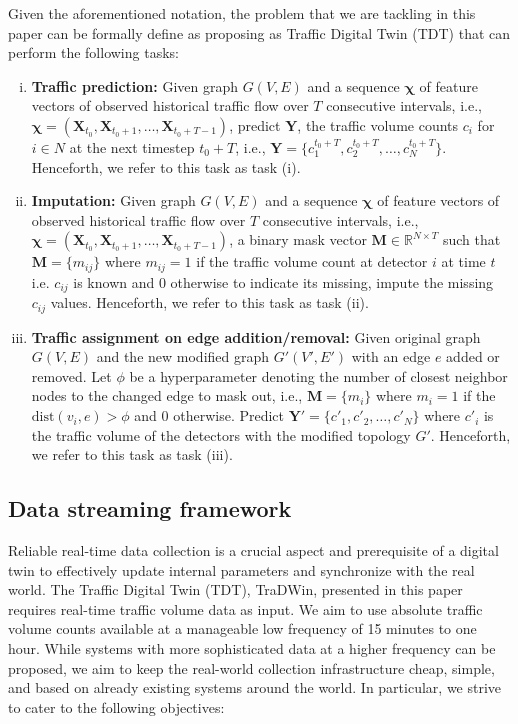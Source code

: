 \documentclass[conference]{IEEEtran}
\newcommand{\name}{TraDWin}
\begin{document}
Given the aforementioned notation, the problem that we are tackling in this paper can be formally define as proposing as Traffic Digital Twin (TDT) that can perform the following tasks:
\begin{enumerate}[(i)]
    \item \textbf{Traffic prediction:} Given graph $G(V, E)$ and a sequence $\bm{\chi}$ of feature vectors of observed historical traffic flow over $T$ consecutive intervals, i.e., $\bm{\chi} = (\mathbf{X}_{t_0}, \mathbf{X}_{t_0+1}, \ldots, \mathbf{X}_{t_0+T-1})$, predict $\mathbf{Y}$, the traffic volume counts $c_i$ for $i \in N$ at the next timestep $t_0+T$, i.e., $\mathbf{Y} = \{c_1^{t_0+T}, c_2^{t_0+T}, \ldots, c_N^{t_0+T}\}$. Henceforth, we refer to this task as task (i).
    \item \textbf{Imputation:} Given graph $G(V,E)$ and a sequence $\bm{\chi}$ of feature vectors of observed historical traffic flow over $T$ consecutive intervals, i.e., $\bm{\chi} = (\mathbf{X}_{t_0}, \mathbf{X}_{t_0+1}, \ldots, \mathbf{X}_{t_0+T-1})$, a binary mask vector $\mathbf{M} \in \mathbb{R}^{N \times T}$ such that $\mathbf{M} = \{m_{ij}\}$ where $m_{ij} = 1$ if the traffic volume count at detector $i$ at time $t$ i.e. $c_{ij}$ is known and 0 otherwise to indicate its missing, impute the missing $c_{ij}$ values. Henceforth, we refer to this task as task (ii).
    \item \textbf{Traffic assignment on edge addition/removal:} Given original graph $G(V,E)$ and the new modified graph $G'(V', E')$ with an edge $e$ added or removed. Let $\phi$ be a hyperparameter denoting the number of closest neighbor nodes to the changed edge to mask out, i.e., $\mathbf{M} = \{m_i\}$ where $m_i = 1$ if the $\text{dist}(v_i,e)> \phi$ and 0 otherwise. Predict $\mathbf{Y'} = \{c'_1, c'_2, \ldots, c'_N \}$ where $c'_i$ is the traffic volume of the detectors with the modified topology $G'$. Henceforth, we refer to this task as task (iii).
\end{enumerate}

\subsection{\textbf{Data streaming framework}}

Reliable real-time data collection is a crucial aspect and prerequisite of a digital twin to effectively update internal parameters and synchronize with the real world. The Traffic Digital Twin (TDT), \name, presented in this paper requires real-time traffic volume data as input. We aim to use absolute traffic volume counts available at a manageable low frequency of 15 minutes to one hour. While systems with more sophisticated data at a higher frequency can be proposed, we aim to keep the real-world collection infrastructure cheap, simple, and based on already existing systems around the world. In particular, we strive to cater to the following objectives:
\end{document}
